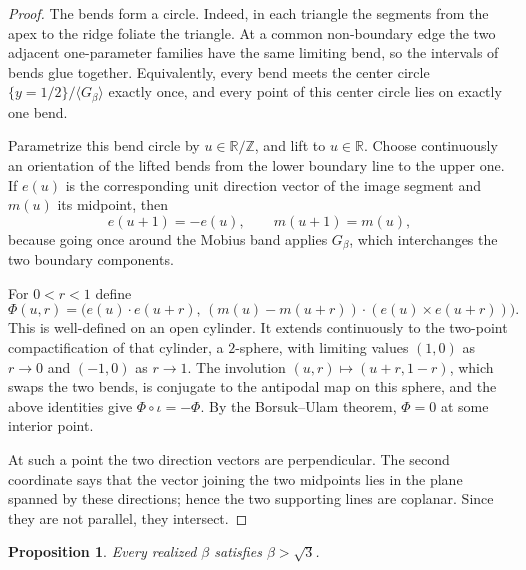 \documentclass[12pt]{article}
\newtheorem{proposition}{Proposition}
\newcommand{\R}{\mathbb R}
\newcommand{\Z}{\mathbb Z}
\begin{document}
\begin{proof}
The bends form a circle.  Indeed, in each triangle the segments from the
apex to the ridge foliate the triangle.  At a common non-boundary edge
the two adjacent one-parameter families have the same limiting bend, so
the intervals of bends glue together.  Equivalently, every bend meets the
center circle \(\{y=1/2\}/\langle G_\beta\rangle\) exactly once, and every
point of this center circle lies on exactly one bend.

Parametrize this bend circle by \(u\in\R/\Z\), and lift to \(u\in\R\).
Choose continuously an orientation of the lifted bends from the lower
boundary line to the upper one.  If \(e(u)\) is the corresponding unit
direction vector of the image segment and \(m(u)\) its midpoint, then
\[
        e(u+1)=-e(u),\qquad  m(u+1)=m(u),
\]
because going once around the Mobius band applies \(G_\beta\), which
interchanges the two boundary components.

For \(0<r<1\) define
\[
 \Phi(u,r)=\Big(e(u)\!\cdot e(u+r),\,
 (m(u)-m(u+r))\!\cdot (e(u)\times e(u+r))\Big).
\]
This is well-defined on an open cylinder.  It extends continuously to the
two-point compactification of that cylinder, a \(2\)-sphere, with limiting
values \((1,0)\) as \(r\to0\) and \((-1,0)\) as \(r\to1\).  The involution
\((u,r)\mapsto(u+r,1-r)\), which swaps the two bends, is conjugate to the
antipodal map on this sphere, and the above identities give
\(\Phi\circ\iota=-\Phi\).  By the Borsuk--Ulam theorem, \(\Phi=0\) at
some interior point.

At such a point the two direction vectors are perpendicular.  The second
coordinate says that the vector joining the two midpoints lies in the
plane spanned by these directions; hence the two supporting lines are
coplanar.  Since they are not parallel, they intersect.
\end{proof}

\begin{proposition}\label{prop:lower}
Every realized \(\beta\) satisfies \(\beta>\sqrt3\).
\end{proposition}
\end{document}
